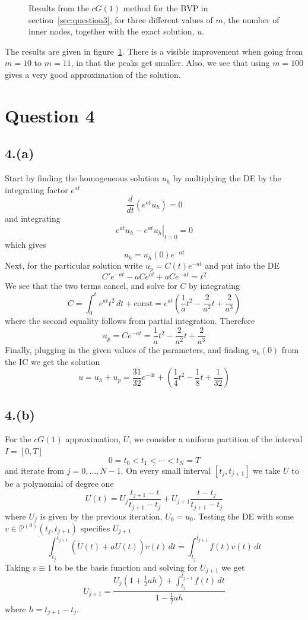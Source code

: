 \documentclass{article}
\begin{document}
\begin{figure}
  \begin{center}
    
  \end{center}
  \caption{Results from the $cG(1)$ method for the BVP in section~\ref{sec:question3},
    for three different values of $m$, the number of inner nodes,
    together with the exact solution, $u$. \label{fig:3-cG1-bvp}}
\end{figure}

The results are given in figure~\ref{fig:3-cG1-bvp}.
There is a visible improvement when going from $m=10$ to $m=11$,
in that the peaks get smaller.
Also, we see that using $m=100$ gives a very good approximation
of the solution.

\section{Question 4}\label{sec:question4}

\subsection{4.(a)}

Start by finding the homogeneous solution $u_h$
by multiplying the DE by the integrating factor $e^{at}$
$$ \frac d {dt} \left(e^{at} u_h\right) = 0 $$
and integrating
$$ e^{at} u_h - \left. e^{at} u_h \right\vert_{t=0} = 0 $$
which gives
$$ u_h = u_h(0) e^{-at} $$
Next, for the particular solution write $u_p = C(t) e^{-at}$ and put into the DE
$$ C' e^{-at} - a C e^{at} + a C e^{-at} = t^2 $$
We see that the two terms cancel, and solve for $C$ by integrating
$$ C = \int_0^t e^{at} t^2 \, dt + \text{const} = e^{at} \left( \frac1a t^2 - \frac2{a^2} t + \frac2{a^3} \right) $$
where the second equality follows from partial integration.
Therefore
$$ u_p = C e^{-at} = \frac1a t^2 - \frac2{a^2} t + \frac2{a^3} $$
Finally, plugging in the given values of the parameters,
and finding $u_h(0)$ from the IC we get the solution
$$ u = u_h + u_p = \frac{31}{32} e^{-4t} + \left( \frac14 t^2 - \frac18 t + \frac1{32} \right) $$

\subsection{4.(b)}

For the $cG(1)$ approximation, $U$,
we consider a uniform partition of the interval $I=[0, T]$
$$ 0 = t_0 < t_1 < \cdots < t_N = T $$
and iterate from $j = 0, \ldots, N-1 $.
On every small interval $[t_j, t_{j+1}]$ we take $U$ to be
a polynomial of degree one
$$ U(t) = U_j \frac{t_{j+1} - t}{t_{j+1} - t_j} + U_{j+1} \frac{t - t_j}{t_{j+1} - t_j} $$
where $U_j$ is given by the previous iteration, $U_0 = u_0$.
Testing the DE with some $v \in \mathbb P^{(0)}(t_j, t_{j+1})$ specifies $U_{j+1}$
$$ \int_{t_j}^{t_{j+1}} (\dot U(t) + a U(t)) v(t) \, dt = \int_{t_j}^{t_{j+1}} f(t) v(t) \, dt $$
Taking $v \equiv 1$ to be the basis function and solving for $U_{j+1}$ we get
$$ U_{j+1} = \frac{U_j \left( 1 + \frac12 a h \right) + \int_{t_j}^{t_{j+1}} f(t) \, dt}{1 - \frac12 a h} $$
where $h = t_{j+1} - t_j$.
\end{document}
